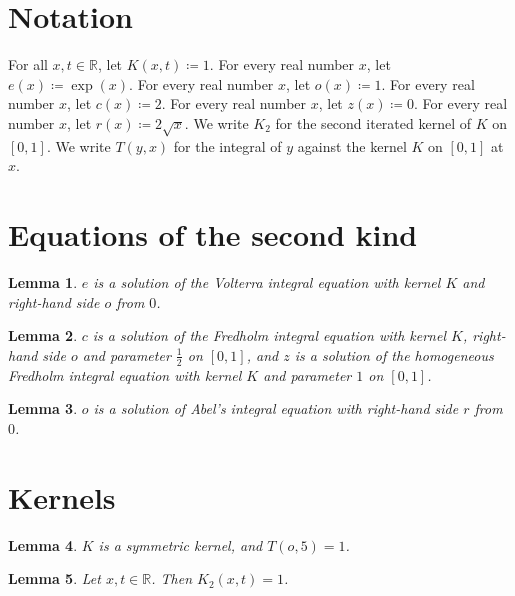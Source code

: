 \documentclass{article}
\newtheorem{lemma}{Lemma}
\begin{document}
\section{Notation}

For all $x,t\in\mathbb{R}$, let $K(x,t)\coloneqq1$.
For every real number $x$, let $e(x)\coloneqq\exp(x)$.
For every real number $x$, let $o(x)\coloneqq1$.
For every real number $x$, let $c(x)\coloneqq2$.
For every real number $x$, let $z(x)\coloneqq0$.
For every real number $x$, let $r(x)\coloneqq2\sqrt{x}$.
We write $K_2$ for the second iterated kernel of $K$ on $[0,1]$.
We write $T(y,x)$ for the integral of $y$ against the kernel $K$ on $[0,1]$ at $x$.

\section{Equations of the second kind}

\begin{lemma}\label{volterra}
$e$ is a solution of the Volterra integral equation with kernel $K$ and right-hand side $o$ from $0$.
\end{lemma}

\begin{lemma}\label{fredholm}
$c$ is a solution of the Fredholm integral equation with kernel $K$, right-hand side $o$ and parameter $\frac12$ on $[0,1]$, and $z$ is a solution of the homogeneous Fredholm integral equation with kernel $K$ and parameter $1$ on $[0,1]$.
\end{lemma}

\begin{lemma}\label{abel}
$o$ is a solution of Abel's integral equation with right-hand side $r$ from $0$.
\end{lemma}

\section{Kernels}

\begin{lemma}\label{kernels}
$K$ is a symmetric kernel, and $T(o,5)=1$.
\end{lemma}

\begin{lemma}\label{iterated}
Let $x,t\in\mathbb{R}$. Then $K_2(x,t)=1$.
\end{lemma}
\end{document}
